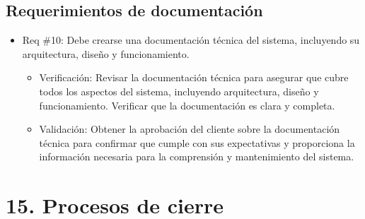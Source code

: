 \documentclass[
11pt, %
codirector, %
]{charter}
\begin{document}
\subsection{Requerimientos de documentación}

\begin{itemize}
\item Req \#10: Debe crearse una documentación técnica del sistema, incluyendo su arquitectura, diseño y funcionamiento.

\begin{itemize}
	\item Verificación: Revisar la documentación técnica para asegurar que cubre todos los aspectos del sistema, incluyendo arquitectura, diseño y funcionamiento. Verificar que la documentación es clara y completa.
	\item Validación: Obtener la aprobación del cliente sobre la documentación técnica para confirmar que cumple con sus expectativas y proporciona la información necesaria para la comprensión y mantenimiento del sistema.
\end{itemize}
\end{itemize}


\section{15. Procesos de cierre}    
\label{sec:cierre}
\end{document}
